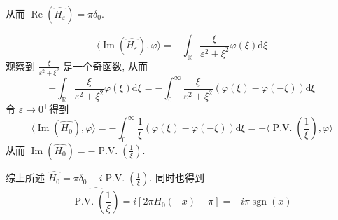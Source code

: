 \documentclass[11pt]{ctexart}[UTF8]
\begin{document}
从而 $\operatorname{Re}(\widehat{H_{\varepsilon}}) = \pi\delta_{0}$.\par
\begin{equation*}
    \langle \operatorname{Im}(\widehat{H_{\varepsilon}}), \varphi \rangle = -\int_{\mathbb{R}} \frac{\xi}{\varepsilon^2 + \xi^2} \varphi(\xi) \mathrm{d}\xi 
\end{equation*}
观察到 $\frac{\xi}{\varepsilon^2 + \xi^2}$ 是一个奇函数, 从而
\begin{equation*}
    -\int_{\mathbb{R}} \frac{\xi}{\varepsilon^2 + \xi^2} \varphi(\xi) \mathrm{d}\xi = -\int_{0}^{\infty} \frac{\xi}{\varepsilon^2 + \xi^2} (\varphi(\xi) - \varphi(-\xi)) \mathrm{d}\xi
\end{equation*}
令 $\varepsilon \to 0^+$得到
\begin{equation*}
    \langle \operatorname{Im}(\widehat{H_{0}}), \varphi \rangle = -\int_{0}^{\infty} \frac{1}{\xi} (\varphi(\xi) - \varphi(-\xi)) \mathrm{d}\xi = -\langle \operatorname{P.V.} \left(\frac{1}{\xi}\right), \varphi \rangle
\end{equation*}
从而 $\operatorname{Im}(\widehat{H_{0}}) = -\operatorname{P.V.} \left(\frac{1}{\xi}\right)$.\par
综上所述 $\widehat{H_{0}} = \pi\delta_{0} - i \operatorname{P.V.} \left(\frac{1}{\xi}\right)$. 同时也得到
$$\widehat{\operatorname{P.V.} \left(\frac{1}{\xi}\right)} = i\left[2\pi H_{0}(-x) - \pi\right] = -i\pi \operatorname{sgn}(x)$$
\end{document}
